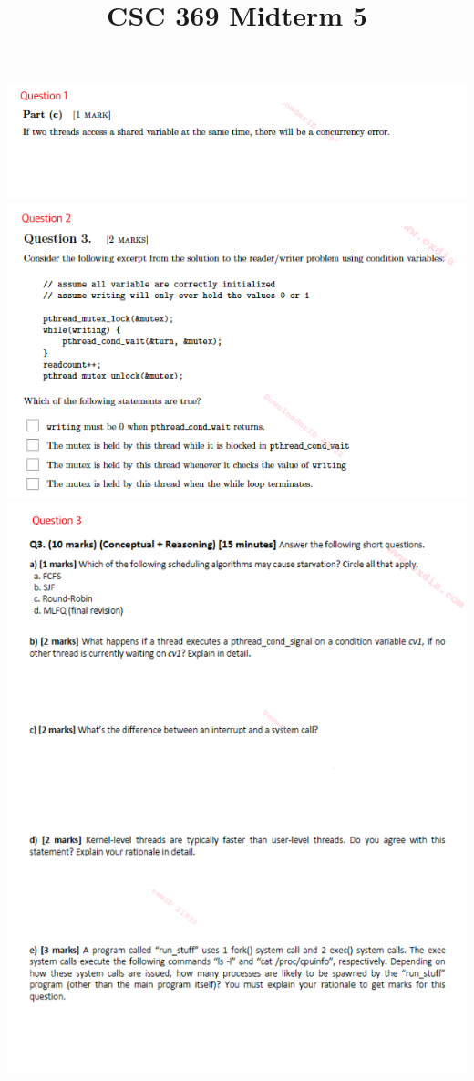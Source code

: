 \documentclass[12pt]{article}
\begin{document}
\title{CSC 369 Midterm 5}

\bigskip

\begin{center}
    \includegraphics[width=\linewidth]{../images/midterm_5_1.png}
    \includegraphics[width=\linewidth]{../images/midterm_5_2.png}
    \includegraphics[width=\linewidth]{../images/midterm_5_3.png}

\end{center}
\end{document}
